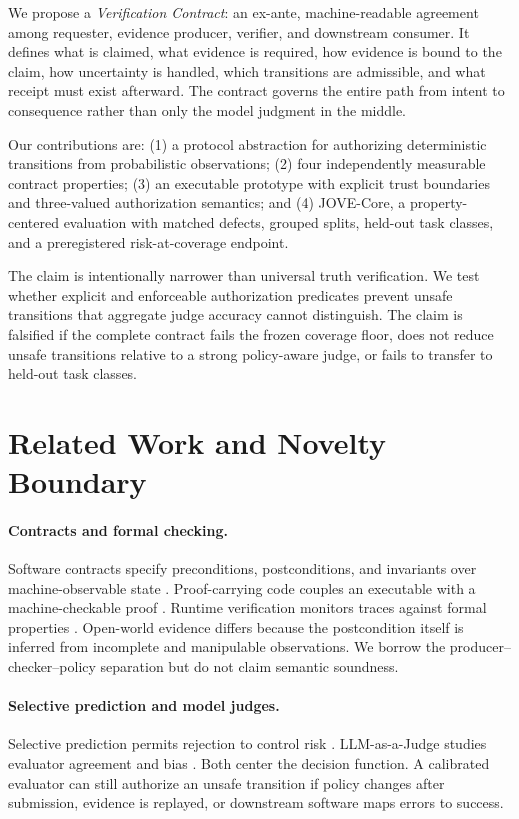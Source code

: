 \documentclass[sigconf,anonymous,review]{acmart}
\begin{document}
We propose a \emph{Verification Contract}: an ex-ante, machine-readable agreement among requester, evidence producer, verifier, and downstream consumer. It defines what is claimed, what evidence is required, how evidence is bound to the claim, how uncertainty is handled, which transitions are admissible, and what receipt must exist afterward. The contract governs the entire path from intent to consequence rather than only the model judgment in the middle.

Our contributions are: (1) a protocol abstraction for authorizing deterministic transitions from probabilistic observations; (2) four independently measurable contract properties; (3) an executable prototype with explicit trust boundaries and three-valued authorization semantics; and (4) JOVE-Core, a property-centered evaluation with matched defects, grouped splits, held-out task classes, and a preregistered risk-at-coverage endpoint.

The claim is intentionally narrower than universal truth verification. We test whether explicit and enforceable authorization predicates prevent unsafe transitions that aggregate judge accuracy cannot distinguish. The claim is falsified if the complete contract fails the frozen coverage floor, does not reduce unsafe transitions relative to a strong policy-aware judge, or fails to transfer to held-out task classes.

\section{Related Work and Novelty Boundary}
\sloppy
\paragraph{Contracts and formal checking.} Software contracts specify preconditions, postconditions, and invariants over machine-observable state \cite{meyer1997object}. Proof-carrying code couples an executable with a machine-checkable proof \cite{necula1997proof}. Runtime verification monitors traces against formal properties \cite{leucker2009brief}. Open-world evidence differs because the postcondition itself is inferred from incomplete and manipulable observations. We borrow the producer--checker--policy separation but do not claim semantic soundness.

\paragraph{Selective prediction and model judges.} Selective prediction permits rejection to control risk \cite{geifman2017selective,geifman2019selectivenet,kamath2020selectiveqa,hendrickx2024reject}. LLM-as-a-Judge studies evaluator agreement and bias \cite{zheng2023judging,liu2023geval,wang2024fair}. Both center the decision function. A calibrated evaluator can still authorize an unsafe transition if policy changes after submission, evidence is replayed, or downstream software maps errors to success.
\end{document}
